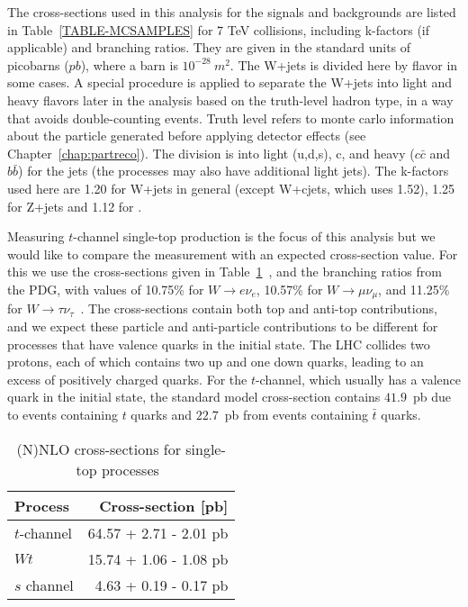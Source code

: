 The cross-sections used in this analysis for the signals and backgrounds are listed in Table~\ref{TABLE-MCSAMPLES} for 7 TeV collisions, including k-factors (if applicable) and branching ratios.  They are given in the standard units of picobarns ($pb$), where a barn is $10^{-28}~m^{2}$.  The W+jets is divided here by flavor in some cases.  A special procedure is applied to separate the W+jets into light and heavy flavors later in the analysis based on the truth-level hadron type, in a way that avoids double-counting events.  Truth level refers to monte carlo information about the particle generated before applying detector effects (see Chapter~\ref{chap:partreco}).  The division is into light (u,d,s), c, and heavy ($c\bar{c}$ and $b\bar{b}$) for the jets (the processes may also have additional light jets).  The k-factors used here are 1.20 for W+jets in general (except W+cjets, which uses 1.52), 1.25 for Z+jets and 1.12 for \ttbar.

Measuring $t$-channel single-top production is the focus of this analysis but we would like to compare the measurement with an expected cross-section value.  For this we use the cross-sections given in Table~\ref{TABLE-STOP}~\cite{Kidonakis:2010tc,Kidonakis:2010ux, Kidonakis:2011wy}, and the branching ratios from the PDG, with values of 10.75\% for $W \rightarrow e \nu_{e}$, 10.57\% for $W \rightarrow \mu \nu_{\mu}$, and 11.25\% for $W \rightarrow \tau \nu_{\tau}$~\cite{PDGSummary}.  The cross-sections contain both top and anti-top contributions, and we expect these particle and anti-particle contributions to be different for processes that have valence quarks in the initial state.  The LHC collides two protons, each of which contains two up and one down quarks, leading to an excess of positively charged quarks.  For the $t$-channel, which usually has a valence quark in the initial state, the standard model cross-section contains $41.9$~pb due to events containing $t$ quarks and $22.7$~pb from events containing $\bar{t}$ quarks.
\begin{table}[htdp]
\begin{center}
\begin{tabular}{l|r}
 \hline
 Process        & Cross-section [pb] \\
\hline
 $t$-channel & 64.57 + 2.71 - 2.01 pb\\
 $Wt$ &  15.74 + 1.06 - 1.08 pb \\
 $s$ channel &  4.63 + 0.19 - 0.17 pb \\ 
\hline
\end{tabular}
\caption{ (N)NLO cross-sections for single-top processes~\cite{Kidonakis:2010tc,Kidonakis:2010ux, Kidonakis:2011wy}}
\label{TABLE-STOP}
\end{center}
\end{table}

